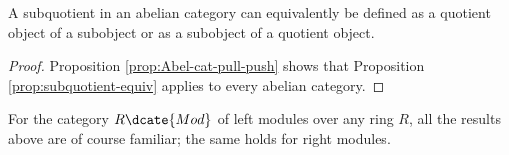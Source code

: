\begin{corollary}\label{prop:Abel-cat-subquotient}
	A subquotient in an abelian category can equivalently be defined as a
	quotient object of a subobject or as a subobject of a quotient object.
\end{corollary}
\begin{proof}
	Proposition \ref{prop:Abel-cat-pull-push} shows that Proposition
	\ref{prop:subquotient-equiv} applies to every abelian category.
\end{proof}

For the category $R\dcate{Mod}$ of left modules over any ring $R$, all the
results above are of course familiar; the same holds for right modules.

